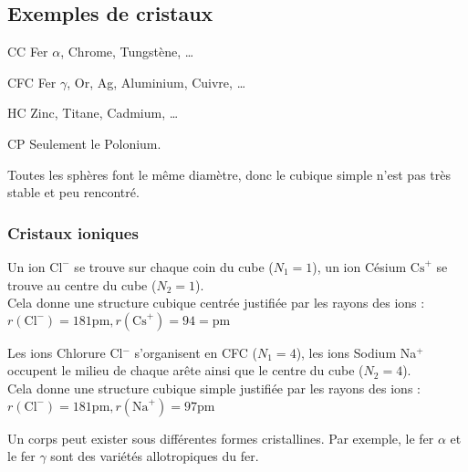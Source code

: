 \subsection*{Exemples de cristaux}
\begin{ex}
    \begin{compactdesc}
        \item[CC] Fer $\alpha$, Chrome, Tungstène, \dots
        \item[CFC] Fer $\gamma$, Or, Ag, Aluminium, Cuivre, \dots
        \item[HC] Zinc, Titane, Cadmium, \dots
        \item[CP] Seulement le Polonium.
    \end{compactdesc}
\end{ex}
\begin{rem}
    Toutes les sphères font le même diamètre, donc le cubique simple n'est pas
    très stable et peu rencontré.
\end{rem}

\subsubsection*{Cristaux ioniques}
\begin{ex}
    Un ion $\text{Cl}^-$ se trouve sur chaque coin du cube ($N_1 = 1$), un ion
    Césium $\text{Cs}^+$ se trouve au centre du cube ($N_2 = 1$).\\
    Cela donne une structure cubique centrée justifiée par les rayons des ions
    : $r(\text{Cl}^-) = 181\text{pm}, r(\text{Cs}^+) = 94 =\text{pm}$
\end{ex}
\begin{ex}
    Les ions Chlorure Cl$^-$ s'organisent en CFC ($N_1 = 4$), les ions Sodium
    Na$^+$ occupent le milieu de chaque arête ainsi que le centre du cube
    ($N_2 = 4$).\\
    Cela donne une structure cubique simple justifiée par les rayons des
    ions :
    $r(\text{Cl}^-) = 181\text{pm}, r(\text{Na}^+) = 97\text{pm}$
\end{ex}

\begin{rem}
    Un corps peut exister sous différentes formes cristallines. Par exemple,
    le fer $\alpha$ et le fer $\gamma$ sont des variétés allotropiques du
    fer.
\end{rem}


